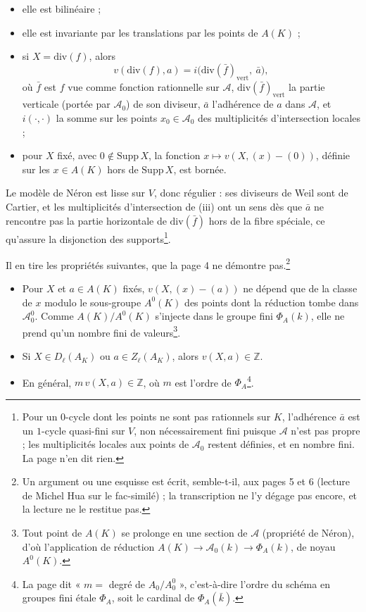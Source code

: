 \documentclass[11pt,a4paper]{article}
\begin{document}
\begin{itemize}
  \item[(i)] elle est bilinéaire ;
  \item[(ii)] elle est invariante par les translations par les points de
  $A(K)$ ;
  \item[(iii)] si $X = \mathrm{div}(f)$, alors
  \[
    v(\mathrm{div}(f), a) = i\bigl(\mathrm{div}(\bar f)_{\mathrm{vert}},\ \bar a\bigr),
  \]
  où $\bar f$ est $f$ vue comme fonction rationnelle sur $\mathcal{A}$,
  $\mathrm{div}(\bar f)_{\mathrm{vert}}$ la partie verticale (portée par
  $\mathcal{A}_0$) de son diviseur, $\bar a$ l'adhérence de $a$ dans
  $\mathcal{A}$, et $i(\cdot,\cdot)$ la somme sur les points
  $x_0 \in \mathcal{A}_0$ des multiplicités d'intersection locales ;
  \item[(iv)] pour $X$ fixé, avec $0 \notin \mathrm{Supp}\,X$, la fonction
  $x \mapsto v(X, (x) - (0))$, définie sur les $x \in A(K)$ hors de
  $\mathrm{Supp}\,X$, est bornée.
\end{itemize}

Le modèle de Néron est lisse sur $V$, donc régulier : ses diviseurs de Weil
sont de Cartier, et les multiplicités d'intersection de (iii) ont un sens
dès que $\bar a$ ne rencontre pas la partie horizontale de
$\mathrm{div}(\bar f)$ hors de la fibre spéciale, ce qu'assure la
disjonction des supports\footnote{Pour un $0$-cycle dont les points ne
sont pas rationnels sur $K$, l'adhérence $\bar a$ est un $1$-cycle
quasi-fini sur $V$, non nécessairement fini puisque $\mathcal{A}$ n'est pas
propre ; les multiplicités locales aux points de $\mathcal{A}_0$ restent
définies, et en nombre fini. La page n'en dit rien.}.

Il en tire les propriétés suivantes, que la page 4 ne démontre pas.\footnote{Un argument ou une esquisse est écrit, semble-t-il, aux pages 5 et 6 (lecture de Michel Hua sur le fac-similé) ; la transcription ne l'y dégage pas encore, et la lecture ne le restitue pas.}

\begin{itemize}
  \item[(iv bis)] Pour $X$ et $a \in A(K)$ fixés, $v(X, (x) - (a))$ ne
  dépend que de la classe de $x$ modulo le sous-groupe $A^0(K)$ des points
  dont la réduction tombe dans $\mathcal{A}_0^0$. Comme $A(K)/A^0(K)$
  s'injecte dans le groupe fini $\Phi_A(k)$, elle ne prend qu'un nombre
  fini de valeurs\footnote{Tout point de $A(K)$ se prolonge en une section
  de $\mathcal{A}$ (propriété de Néron), d'où l'application de réduction
  $A(K) \to \mathcal{A}_0(k) \to \Phi_A(k)$, de noyau $A^0(K)$.}.
  \item[(v)] Si $X \in D_\ell(A_K)$ ou $a \in Z_\ell(A_K)$, alors
  $v(X, a) \in \mathbb{Z}$.
  \item[(vi)] En général, $m\, v(X, a) \in \mathbb{Z}$, où $m$ est l'ordre
  de $\Phi_A$\footnote{La page dit « $m =$ degré de $A_0/A_0^0$ », c'est-à-dire
  l'ordre du schéma en groupes fini étale $\Phi_A$, soit le cardinal de
  $\Phi_A(\bar k)$.}.
\end{itemize}
\end{document}
